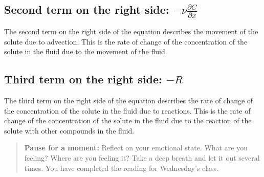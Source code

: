 \documentclass{tufte-handout}\usepackage[]{graphicx}\usepackage[]{xcolor}
\begin{document}
\subsection{Second term on the right side: $- \nu \frac{\partial C}{\partial x}$}

The second term on the right side of the equation describes the movement of the solute due to advection. This is the rate of change of the concentration of the solute in the fluid due to the movement of the fluid.

\subsection{Third term on the right side: $- R$}

The third term on the right side of the equation describes the rate of change of the concentration of the solute in the fluid due to reactions. This is the rate of change of the concentration of the solute in the fluid due to the reaction of the solute with other compounds in the fluid.

\begin{quote}
\textbf{Pause for a moment:} Reflect on your emotional state. What are you feeling? Where are you feeling it? Take a deep breath and let it out several times. You have completed the reading for Wednesday's class. 
\end{quote}
\end{document}
